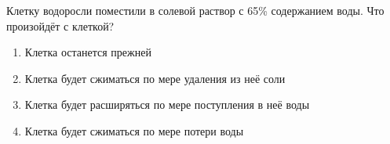 
Клетку водоросли поместили в солевой раствор с 65\% содержанием воды. Что произойдёт с клеткой?

\begin{enumerate}
    \item Клетка останется прежней
    \item Клетка будет сжиматься по мере удаления из неё соли
    \item Клетка будет расширяться по мере поступления в неё воды
    \item Клетка будет сжиматься по мере потери воды
\end{enumerate}



